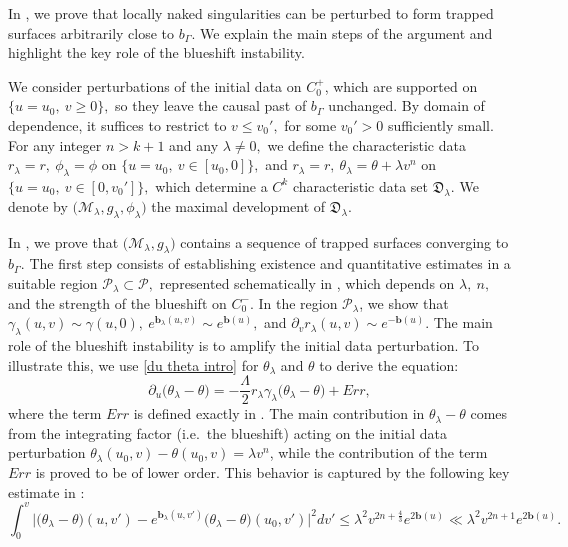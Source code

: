\documentclass[11pt]{article}
\numberwithin{equation}{section}
\begin{document}
In , we prove that locally naked singularities can be perturbed to form trapped surfaces arbitrarily close to $b_{\Gamma}.$ We explain the main steps of the argument and highlight the key role of the blueshift instability.

We consider perturbations of the initial data on $C_0^+$, which are supported on $\{u=u_0,\ v\geq0\},$ so they leave the causal past of $b_{\Gamma}$ unchanged. By domain of dependence, it suffices to restrict to $v\leq v_0',$ for some $v_0'>0$ sufficiently small. For any integer $n>k+1$ and any $\lambda\neq0,$ we define the characteristic data $r_{\lambda}=r,\ \phi_{\lambda}=\phi$ on $\{u=u_0,\ v\in[u_0,0]\},$ and $r_{\lambda}=r,\ \theta_{\lambda}=\theta+\lambda v^n$ on $\{u=u_0,\ v\in[0,v_0']\},$ which determine a $C^k$ characteristic data set $\mathfrak{D}_{\lambda}.$ We denote by $\big(\mathcal{M}_{\lambda},g_{\lambda},\phi_{\lambda}\big)$  the maximal development of $\mathfrak{D}_{\lambda}.$

In , we prove that $\big(\mathcal{M}_{\lambda},g_{\lambda}\big)$ contains a sequence of trapped surfaces converging to $b_{\Gamma}.$ The first step consists of establishing existence and quantitative estimates in a suitable region $\mathcal{P}_{\lambda}\subset\mathcal{P},$ represented schematically in , which depends on $\lambda,\ n,$ and the strength of the blueshift on $C_0^-.$ In the region $\mathcal{P}_{\lambda}$, we show that $\gamma_{\lambda}(u,v)\sim\gamma(u,0),\ e^{\mathbf{b}_{\lambda}(u,v)}\sim e^{\mathbf{b}(u)},$ and $\partial_vr_{\lambda}(u,v)\sim e^{-\mathbf{b}(u)}$. %
The main role of the blueshift instability is to amplify the initial data perturbation. To illustrate this, we use \eqref{du theta intro} for $\theta_{\lambda}$ and $\theta$ to derive the equation:
\begin{equation}\label{du theta difference intro}
    \partial_u\big(\theta_{\lambda}-\theta)=-\frac{\Lambda}{2}r_{\lambda}\gamma_{\lambda}\big(\theta_{\lambda}-\theta)+Err,
\end{equation}
where the term $Err$ is defined exactly in . The main contribution in $\theta_{\lambda}-\theta$ comes from the integrating factor (i.e.~the blueshift) acting on the initial data perturbation $\theta_{\lambda}(u_0,v)-\theta(u_0,v)=\lambda v^n$, while the contribution of the term $Err$ is proved to be of lower order. This behavior is captured by the following key estimate in :
\begin{equation}\label{blueshift instability intro eq}
    \int_0^v\Big|\big(\theta_{\lambda}-\theta\big)(u,v')-e^{\mathbf{b}_{\lambda}(u,v')}\big(\theta_{\lambda}-\theta\big)(u_0,v')\Big|^2dv'\leq\lambda^2v^{2n+\frac{4}{3}}e^{2\mathbf{b}(u)}\ll\lambda^2v^{2n+1}e^{2\mathbf{b}(u)}.
\end{equation}
\end{document}
